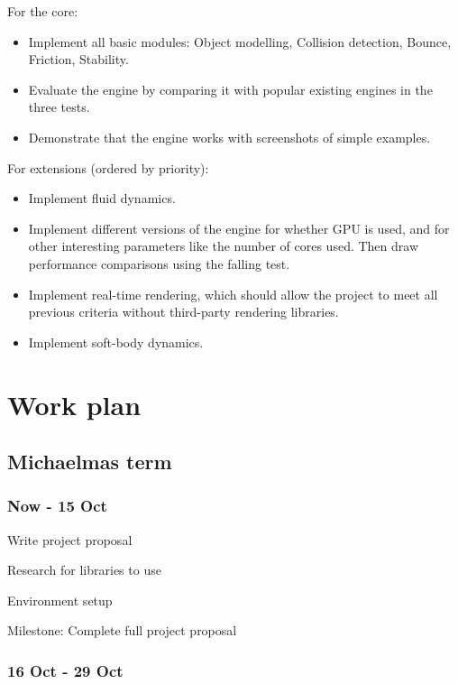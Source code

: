 \documentclass[12pt]{article}
\begin{document}
For the core:

\begin{itemize}
\item Implement all basic modules: Object modelling, Collision detection, Bounce, Friction, Stability.

\item Evaluate the engine by comparing it with popular existing engines in the three tests.

\item Demonstrate that the engine works with screenshots of simple examples.
\end{itemize}

For extensions (ordered by priority):

\begin{itemize}
\item Implement fluid dynamics.

\item Implement different versions of the engine for whether GPU is used, and for other interesting parameters like the number of cores used. 
Then draw performance comparisons using the falling test.

\item Implement real-time rendering, which should allow the project to meet all previous criteria without third-party rendering libraries. 

\item Implement soft-body dynamics.
\end{itemize}

\section{Work plan}

\subsection*{Michaelmas term}

\subsubsection*{Now - 15 Oct}

Write project proposal

Research for libraries to use

Environment setup

Milestone: Complete full project proposal

\subsubsection*{16 Oct - 29 Oct}
\end{document}
